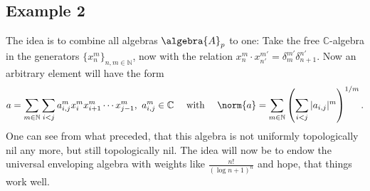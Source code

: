 \documentclass[
11pt,                          %
english                        %
]{article}
\begin{document}
\subsection{Example 2}

The idea is to combine all algebras $\algebra{A}_p$ to one: Take the free  
$\mathbb{C}$-algebra in the generators $\{x_n^m\}_{n,m \in \mathbb{N}}$, now with 
the relation $x_n^m \cdot x_{n'}^{m'} = \delta_m^{m'} \delta_{n+1}^{n'}$. Now an 
arbitrary element will have the form
\begin{equation*}
	a =
	\sum\limits_{m \in \mathbb{N}}
	\sum\limits_{i < j}
	a_{i, j}^m x_i^m x_{i + 1}^m \cdots x_{j - 1}^m
	, \
	a_{i,j}^m \in \mathbb{C}
	\quad \text{ with } \quad
	\norm{a}
	=
	\sum\limits_{m \in \mathbb{N}}
	\left(
		\sum\limits_{i < j}
		|a_{i, j}|^m
	\right)^{1/m}.
\end{equation*}
One can see from what preceded, that this algebra is not uniformly topologically 
nil any more, but still topologically nil. The idea will now be to endow the 
universal enveloping algebra with weights like $\frac{n!}{(\log n + 1)^n}$ and 
hope, that things work well.
\end{document}
